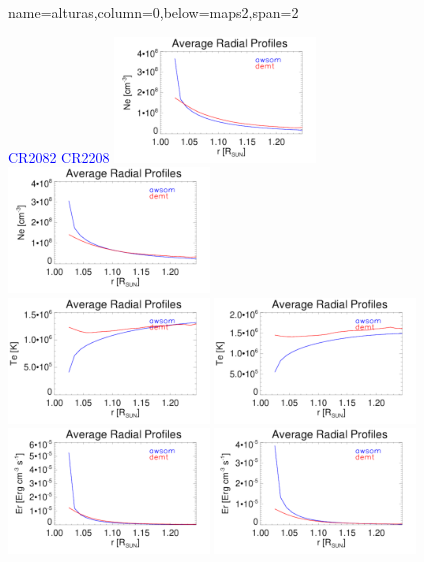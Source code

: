 \documentclass[paperwidth=100cm,paperheight=120cm]{baposter}
\def\azul#1{\textcolor{blue}{#1}}
\begin{document}
\begin{poster}
{name=alturas,column=0,below=maps2,span=2}{
{\footnotesize\sf
\begin{center}
\azul{\hskip 3.5cm CR2082 \hfill CR2208 \hskip 3.5cm}
\vskip 0.01cm
{\includegraphics[width=0.4\textwidth]{Average_Radial_Profiles_Ne_awsom_vs_demt_H_cr2082_ratio_streamer.pdf}}
{\includegraphics[width=0.4\textwidth]{Average_Radial_Profiles_Ne_awsom_vs_demt_H_cr2208_ratio_streamer.pdf}}\\
{\includegraphics[width=0.4\textwidth]{Average_Radial_Profiles_Te_awsom_vs_demt_H_cr2082_ratio_streamer.pdf}}
{\includegraphics[width=0.4\textwidth]{Average_Radial_Profiles_Te_awsom_vs_demt_H_cr2208_ratio_streamer.pdf}}\\
{\includegraphics[width=0.4\textwidth]{Average_Radial_Profiles_Er_awsom_vs_demt_H_cr2082_ratio_streamer.pdf}}
{\includegraphics[width=0.4\textwidth]{Average_Radial_Profiles_Er_awsom_vs_demt_H_cr2208_ratio_streamer.pdf}}\\
\end{center}
\vskip -0.16cm

}}
\end{poster}
\end{document}
